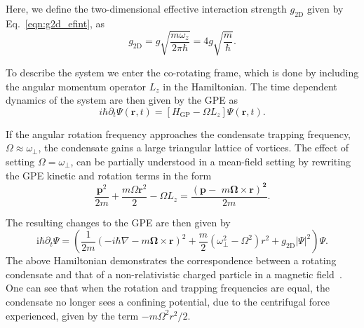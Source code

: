 Here, we define the two-dimensional effective interaction strength $g_{\textrm{2D}}$ given by Eq.~\eqref{eqn:g2d_efint}, as
\begin{equation}
g_{\textrm{2D}} = g\sqrt{\frac{m\omega_z}{2\pi\hbar}} = 4g \sqrt{\frac{m}{\hbar}}.
\end{equation}

To describe the system we enter the co-rotating frame, which is done by including the angular momentum operator $L_z$ in the Hamiltonian. The time dependent dynamics of the system are then given by the GPE as
\begin{equation}\label{eqn:gpe2d_}
	i\hbar\partial_t\Psi(\mathbf{r},t) = \left[ H_{\text{GP}}  -  \Omega L_z \right] \Psi(\mathbf{r},t).
\end{equation}

If the angular rotation frequency approaches the condensate trapping frequency, $\Omega \approx \omega_\perp$, the condensate gains a large triangular lattice of vortices.  The effect of setting $\Omega=\omega_\perp$, can be partially understood in a mean-field setting by rewriting the GPE kinetic and rotation terms in the form
\begin{equation}
    \frac{\mathbf{p}^2}{2m} + \frac{m\Omega\mathbf{r}^2}{2} - \Omega L_z = \frac{\mathbf{\left(p -{\textit{ m}}\boldsymbol{\Omega}\times\mathbf{r}\right)^2}}{2m}.
\end{equation}

The resulting changes to the GPE are then given by
\begin{equation}\label{eqn:vector_potential_gpe}
    \textrm{i}\hbar\partial_t \Psi =
    \left(\frac{1}{2m}(-i\hbar\nabla - m\boldsymbol{\Omega}\times\mathbf{r})^2 + \frac{m}{2}(\omega_\perp^2 - \Omega^2){r}^2 + g_{\textrm{2D}}|\Psi|^2 \right)\Psi.
\end{equation}
The above Hamiltonian demonstrates the correspondence between a rotating condensate and that of a non-relativistic charged particle in a magnetic field~\cite{Vtx:Mueller_prl_2002}.
One can see that when the rotation and trapping frequencies are equal, the condensate no longer sees a confining potential, due to the centrifugal force experienced, given by the term $-m\Omega^2r^2/2$.

